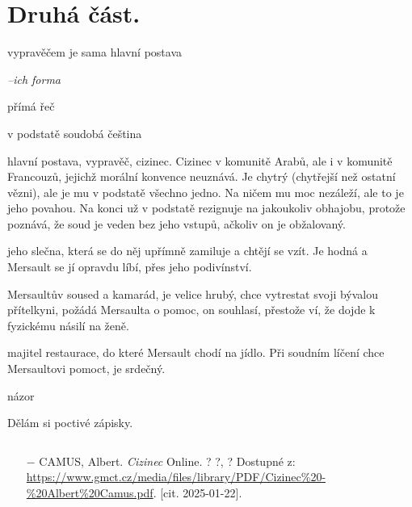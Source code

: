 \documentclass{article}
\begin{document}
\section{Druhá část.}
\begin{description}
    \setlength\itemsep{0.15em}
    \item[vypravěč:] vypravěčem je sama hlavní postava
    \item[vyprávěcí způsoby:] \textit{--ich forma}
    \item[typy promluv:] přímá řeč
    \item[jazyková stránka:] v podstatě soudobá čeština
    \item[postavy:]
        \begin{description}
            \setlength\itemsep{0.15em}
           	\item[Mersault,] hlavní postava, vypravěč, cizinec. Cizinec v komunitě Arabů, ale i v komunitě Francouzů, jejichž morální konvence
                neuznává. Je chytrý (chytřejší než ostatní vězni), ale je mu v podstatě všechno jedno. Na ničem mu moc nezáleží, ale to je
                jeho povahou. Na konci už v podstatě rezignuje na jakoukoliv obhajobu, protože poznává, že soud je veden bez jeho vstupů,
                ačkoliv on je obžalovaný.
            \item[Marie,] jeho slečna, která se do něj upřímně zamiluje a chtějí se vzít. Je hodná a Mersault se jí opravdu líbí, přes
                jeho podivínství.
            \item[Raymond,] Mersaultův soused a kamarád, je velice hrubý, chce vytrestat svoji bývalou přítelkyni, požádá Mersaulta o pomoc,
                on souhlasí, přestože ví, že dojde k fyzickému násilí na ženě.
            \item[Céleste,] majitel restaurace, do které Mersault chodí na jídlo. Při soudním líčení chce Mersaultovi pomoct, je srdečný.
        \end{description}
    \item[názor:] názor
    \item[kontext:]  Dělám si poctivé zápisky.
    \item[zdroje:] $ $
    \begin{itemize}
        \setlength\itemsep{0em}
        \item[$-$] CAMUS, Albert. \textit{Cizinec} Online. ? ?, ? Dostupné z: \url{https://www.gmct.cz/media/files/library/PDF/Cizinec%20-%20Albert%20Camus.pdf}. [cit. 2025-01-22].
    \end{itemize}
\end{description}
\end{document}
